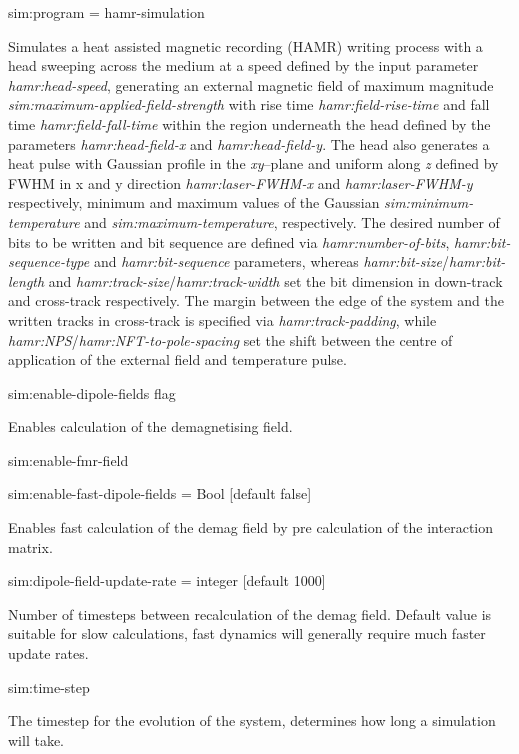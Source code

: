 {\zicf sim:program = hamr-simulation}
Simulates a heat assisted magnetic recording (HAMR) writing process with a head sweeping across the medium at a speed
defined by the input parameter \textit{hamr:head-speed}, generating an external magnetic field of maximum magnitude
\textit{sim:maximum-applied-field-strength} with rise time \textit{hamr:field-rise-time} and fall time \textit{hamr:field-fall-time}
within the region underneath the head defined by the parameters \textit{hamr:head-field-x} and \textit{hamr:head-field-y}.
The head also generates a heat pulse with Gaussian profile in the \textit{xy}--plane and uniform along \textit{z}
defined by FWHM in x and y direction \textit{hamr:laser-FWHM-x} and \textit{hamr:laser-FWHM-y} respectively,
minimum and maximum values of the Gaussian \textit{sim:minimum-temperature} and \textit{sim:maximum-temperature}, respectively.
The desired number of bits to be written and bit sequence are defined via
\textit{hamr:number-of-bits}, \textit{hamr:bit-sequence-type} and \textit{hamr:bit-sequence} parameters, whereas
\textit{hamr:bit-size}/\textit{hamr:bit-length} and \textit{hamr:track-size}/\textit{hamr:track-width} set the bit
dimension in down-track and cross-track respectively.
The margin between the edge of the system and the written tracks in cross-track is specified via
\textit{hamr:track-padding}, while \textit{hamr:NPS}/\textit{hamr:NFT-to-pole-spacing}
set the shift between the centre of application of the external field and temperature pulse.

{\zicf sim:enable-dipole-fields flag} Enables calculation of the demagnetising field.

{\zicf sim:enable-fmr-field}

{\zicf sim:enable-fast-dipole-fields = Bool [default false]} Enables fast calculation of the demag field by pre calculation of the interaction matrix.

{\zicf sim:dipole-field-update-rate = integer [default 1000]}
Number of timesteps between recalculation of the demag field. Default value is suitable for slow calculations, fast dynamics will generally require much faster update rates.

{\zicf sim:time-step} The timestep for the evolution of the system, determines how long a simulation will take.


